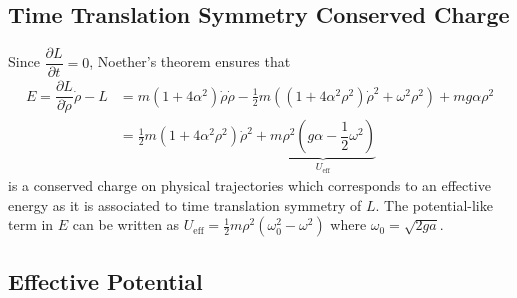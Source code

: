 \documentclass[10pt, a4paper]{article}
\begin{document}
%
\subsection{Time Translation Symmetry Conserved Charge}
Since $\dfrac{\partial L}{\partial t} = 0$, Noether's theorem ensures that 
\begin{align*}
     E = \dfrac{\partial L}{\partial \dot{\rho}}
      \dot{\rho}-L &= m \left(1  + 4\alpha^2 \right) \dot{\rho}\dot{\rho} - \frac{1}{2}m \left(\left(1 + 4\alpha^2 \rho^2\right) \dot{\rho}^2  + \omega^2\rho^2 \right) + mg \alpha \rho^2 \\ &= \frac{1}{2}m\left(1 + 4\alpha^2 \rho^2\right) \dot{\rho}^2 + \underbrace{m \rho^2 \left(g \alpha - \dfrac{1}{2} \omega^2\right)}_{U_\text{eff}} 
\end{align*}
is a conserved charge on physical trajectories which corresponds to an effective energy as it is associated to time translation symmetry of $L$. The potential-like term in $E$ can be written as  $U_\text{eff} = \frac{1}{2}m \rho^2 (\omega_0^2-\omega^2)$ where $\omega_0 = \sqrt{2ga}$.
\subsection{Effective Potential}
\end{document}
